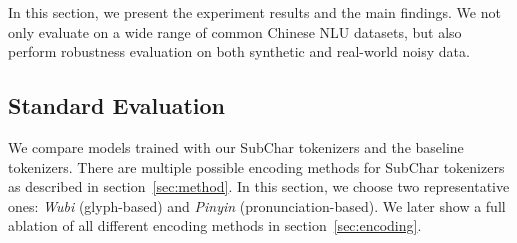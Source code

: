In this section, we present the experiment results and the main findings. We not only evaluate on a wide range of common Chinese NLU datasets, but also perform robustness evaluation on both synthetic and real-world noisy data. 

\subsection{Standard Evaluation}
\label{sec:standard_eval}



We compare models trained with our SubChar tokenizers and the baseline tokenizers. There are multiple possible encoding methods for SubChar tokenizers as described in section~\ref{sec:method}. In this section, we choose two representative ones: \textit{Wubi} (glyph-based) and \textit{Pinyin} (pronunciation-based). We later show a full ablation of all different encoding methods in section~\ref{sec:encoding}.




